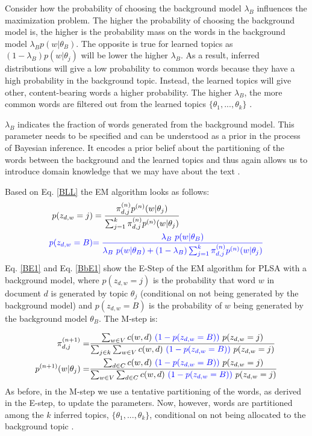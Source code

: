 \documentclass[11pt,a4paper,english,oneside]{book}
\numberwithin{equation}{chapter}
\begin{document}
Consider how the probability of choosing the background model $\lambda_B$ influences the maximization problem. The higher the probability of choosing the background model is, the higher is the probability mass on the words in the background model $\lambda_B  p(w|\theta_B)$.  The opposite is true for learned topics as $(1-\lambda_B)  p(w|\theta_j)$ will be lower the higher $\lambda_B$. As a result, inferred distributions will give a low probability to common words because they have a high probability in the background topic. Instead, the learned topics will give other, content-bearing words a higher probability. The higher $\lambda_B$, the more common words are filtered out from the learned topics $\{\theta_1, ..., \theta_k\}$ \citep[pp. 352--359]{Zhai.2016}.  

$\lambda_B$ indicates the fraction of words generated from the background model. This parameter needs to be specified and can be understood as a prior in the process of Bayesian inference. It encodes a prior belief about the partitioning of the words between the background and the learned topics and thus again allows us to introduce domain knowledge that we may have about the text \citep[pp. 361, 372--376]{Zhai.2016}. 

Based on Eq. \ref{BLL} the EM algorithm looks as follows:
\begin{align}\label{BE1}
p(z_{d,w}=j)&=\frac{\pi_{d,j}^{(n)}p^{(n)}(w|\theta_j)}{\sum_{j=1}^{k}\pi_{d,j}^{(n)}p^{(n)}(w|\theta_j)}\\
\label{BbE1}
\textcolor{blue}{ p(z_{d,w}=B)} & \textcolor{blue}{ =\frac{\lambda_B \ p(w|\theta_B)}{\lambda_B \ p(w|\theta_B) + (1-\lambda_B) \sum_{j=1}^{k}\pi_{d,j}^{(n)}p^{(n)}(w|\theta_j)} }
\end{align}
Eq. \ref{BE1} and Eq. \ref{BbE1} show the E-Step of the EM algorithm for PLSA with a background model, where $p(z_{d,w}=j)$ is the probability that word $w$ in document $d$ is generated by topic $\theta_j$ (conditional on not being generated by the background model) and $p(z_{d,w}=B)$ is the probability of $w$ being generated by the background model $\theta_B$. The M-step is:

\begin{align}%
\label{BM1pi} \pi_{d,j}^{(n+1)}=&\frac{\sum_{w \in V} c(w,d) \ \textcolor{blue}{(1-p(z_{d,w}=B))}\ p(z_{d,w}=j)}{\sum_{j \in k}\sum_{w \in V}c(w,d) \ \textcolor{blue}{(1-p(z_{d,w}=B))} \ p(z_{d,w}=j)}\\
\label{BM1theta} p^{(n+1)}(w|\theta_j)=&\frac{\sum_{d \in C} c(w,d) \ \textcolor{blue}{(1-p(z_{d,w}=B))} \ p(z_{d,w}=j)}{\sum_{w \in V}\sum_{d \in C}c(w,d)\ \textcolor{blue}{(1-p(z_{d,w}=B))}\ p(z_{d,w}=j)}
\end{align}
As before, in the M-step we use a tentative partitioning of the words, as derived in the E-step, to update the parameters. Now, however, words are partitioned among the $k$ inferred topics, $\{\theta_1, ..., \theta_k\}$, conditional on not being allocated to the background topic \citep[pp. 372--376]{Zhai.2016}. 
\end{document}
